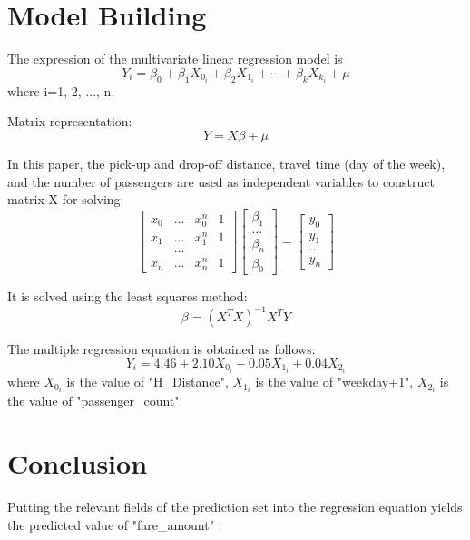 


\section{Model Building} \label{sec-method}


The expression of the multivariate linear regression model is$$
{Y_i} ={\beta_0}+{\beta_1}{X_{0_i}}+{\beta_2}{X_{1_i}}+\cdots+{\beta_k}{X_{k_i}}+{\mu}
$$where i=1, 2, ..., n.

Matrix representation:$$
{Y} ={X}{\beta}+{\mu}$$

In this paper, the pick-up and drop-off distance, travel time (day of the week), and the number of passengers are used as independent variables to construct matrix X for solving: 
\begin{equation*}
  \left[
  \begin{array}{cccc}
   x_{0} &...  & x_{0}^{n} & 1\\
   x_{1} &...  & x_{1}^{n} & 1\\
    &...&  &\\
   x_{n} &...  &x_{n}^{n} & 1
  \end{array}
  \right ]
  \left[
  \begin{array}{cccc}
  {\beta}_{1}\\
  \ldots \\
  {\beta}_{n}\\
  {\beta}_{0}
  \end{array}
  \right ]
  =
  \left[
  \begin{array}{cccc}
  y_{0}\\
  y_{1}\\
  \ldots \\
  y_{n}
  \end{array}
  \right ]
\end{equation*}

It is solved using the least squares method:$$
{\beta}=({X^T}{X})^{-1}{X^T}Y
$$

The multiple regression equation is obtained as follows:$$
{Y_i} =4.46+2.10{X_{0_i}}-0.05{X_{1_i}}+0.04{X_{2_i}}
$$where ${X_{0_i}}$ is the value of "H\_Distance", ${X_{1_i}}$ is the value of "weekday+1", ${X_{2_i}}$ is the value of "passenger\_count".


\section{Conclusion} \label{sec-method}
Putting the relevant fields of the prediction set into the regression equation yields the predicted value of "fare_amount" :

